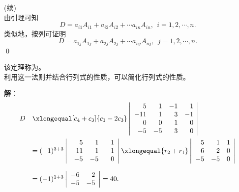 \begin{frame}
  \begin{footnotesize}
    \proofname(续)\\[0.2cm]
    由引理可知
    $$
    D = a_{i1} A_{i1} + a_{i2} A_{i2} + \cdots a_{in} A_{in}, \ \ i = 1, 2, \cdots, n.
    $$
    类似地，按列可证明
    $$
    D = a_{1j} A_{1j} + a_{2j} A_{2j} + \cdots a_{nj} A_{nj}, \ \ j = 1, 2, \cdots, n.
    $$
    \qed

    该定理称为。 \\[0.3cm]
    
    利用这一法则并结合行列式的性质，可以简化行列式的性质。
    
  \end{footnotesize}
\end{frame}


\begin{frame}
  \begin{footnotesize}
    \vspace{0.3cm}
    \textbf{解}：
    $$
    \begin{array}{ll}
      D&  \xlongequal[c_4+c_3]{c_1-2c_3} \left|
      \begin{array}{rrrr}
        5  & 1 & -1 & 1  \\
        -11 & 1 &  3 & -1 \\
        0 & 0 &  1 & 0 \\
        -5 & -5 & 3 & 0 
      \end{array}
      \right|\\[0.8cm]
      & = (-1)^{3+3} \left|
      \begin{array}{rrr}
        5 & 1 & 1\\
        -11 & 1 & -1 \\
        -5 & -5 & 0
      \end{array}
      \right| 
      \xlongequal{r_2+r_1}
      \left|
      \begin{array}{rrr}
        5 & 1 & 1\\
        -6 & 2 & 0 \\
        -5 & -5 & 0
      \end{array}
      \right|\\[0.8cm]
      & = (-1)^{1+3} \left|
      \begin{array}{rr}
        -6 &  2\\
        -5 & -5
      \end{array}
      \right| = 40.
    \end{array}
    $$    
  \end{footnotesize}
\end{frame}


